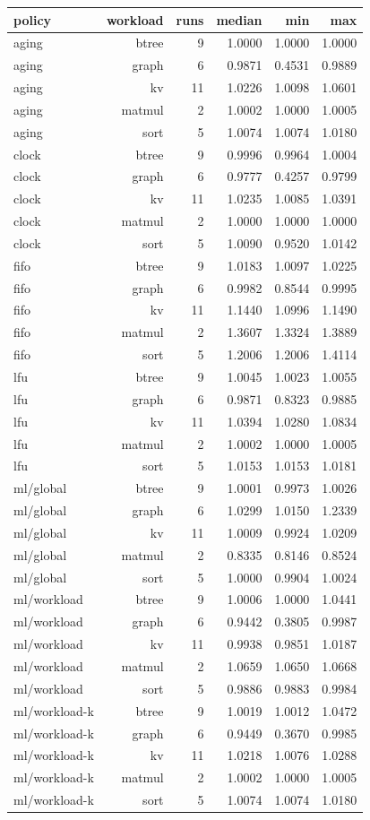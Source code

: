 \begin{tabular}{lrrrrr}
\toprule
policy & workload & runs & median & min & max \\
\midrule
aging & btree & 9 & 1.0000 & 1.0000 & 1.0000 \\
aging & graph & 6 & 0.9871 & 0.4531 & 0.9889 \\
aging & kv & 11 & 1.0226 & 1.0098 & 1.0601 \\
aging & matmul & 2 & 1.0002 & 1.0000 & 1.0005 \\
aging & sort & 5 & 1.0074 & 1.0074 & 1.0180 \\
clock & btree & 9 & 0.9996 & 0.9964 & 1.0004 \\
clock & graph & 6 & 0.9777 & 0.4257 & 0.9799 \\
clock & kv & 11 & 1.0235 & 1.0085 & 1.0391 \\
clock & matmul & 2 & 1.0000 & 1.0000 & 1.0000 \\
clock & sort & 5 & 1.0090 & 0.9520 & 1.0142 \\
fifo & btree & 9 & 1.0183 & 1.0097 & 1.0225 \\
fifo & graph & 6 & 0.9982 & 0.8544 & 0.9995 \\
fifo & kv & 11 & 1.1440 & 1.0996 & 1.1490 \\
fifo & matmul & 2 & 1.3607 & 1.3324 & 1.3889 \\
fifo & sort & 5 & 1.2006 & 1.2006 & 1.4114 \\
lfu & btree & 9 & 1.0045 & 1.0023 & 1.0055 \\
lfu & graph & 6 & 0.9871 & 0.8323 & 0.9885 \\
lfu & kv & 11 & 1.0394 & 1.0280 & 1.0834 \\
lfu & matmul & 2 & 1.0002 & 1.0000 & 1.0005 \\
lfu & sort & 5 & 1.0153 & 1.0153 & 1.0181 \\
ml/global & btree & 9 & 1.0001 & 0.9973 & 1.0026 \\
ml/global & graph & 6 & 1.0299 & 1.0150 & 1.2339 \\
ml/global & kv & 11 & 1.0009 & 0.9924 & 1.0209 \\
ml/global & matmul & 2 & 0.8335 & 0.8146 & 0.8524 \\
ml/global & sort & 5 & 1.0000 & 0.9904 & 1.0024 \\
ml/workload & btree & 9 & 1.0006 & 1.0000 & 1.0441 \\
ml/workload & graph & 6 & 0.9442 & 0.3805 & 0.9987 \\
ml/workload & kv & 11 & 0.9938 & 0.9851 & 1.0187 \\
ml/workload & matmul & 2 & 1.0659 & 1.0650 & 1.0668 \\
ml/workload & sort & 5 & 0.9886 & 0.9883 & 0.9984 \\
ml/workload-k & btree & 9 & 1.0019 & 1.0012 & 1.0472 \\
ml/workload-k & graph & 6 & 0.9449 & 0.3670 & 0.9985 \\
ml/workload-k & kv & 11 & 1.0218 & 1.0076 & 1.0288 \\
ml/workload-k & matmul & 2 & 1.0002 & 1.0000 & 1.0005 \\
ml/workload-k & sort & 5 & 1.0074 & 1.0074 & 1.0180 \\
\bottomrule
\end{tabular}
